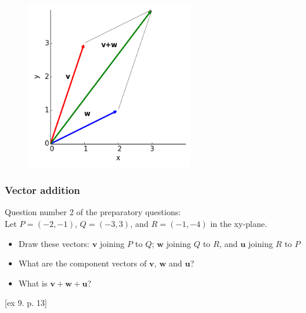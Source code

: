 \documentclass{beamer}
\begin{document}
\begin{frame}

\begin{figure}[htbp]
\begin{center}
 \includegraphics[width=0.65\textwidth]{figure2b.png}
\caption{}
\end{center}
\end{figure}
\end{frame}

\begin{frame}
\frametitle{Vector addition}
Question number 2 of the preparatory questions:\\[1cm]
Let $P = (-2,-1)$, $Q = (-3,3)$, and $R = (-1,-4)$ in the xy-plane.\\
\begin{itemize}
\item Draw these vectors: $\mathbf{v}$ joining $P$ to $Q$; $\mathbf{w}$  joining $Q$ to $R$, and $\mathbf{u}$  joining $R$ to $P$
\item What are the component vectors of $\mathbf{v}$, $\mathbf{w}$ and $\mathbf{u}$?
\item What is $\mathbf{v + w + u}$?
\end{itemize}
[ex 9. p. 13]
\end{frame}
\end{document}
